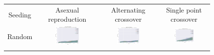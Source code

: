 \documentclass{article}
\begin{document}
\pagestyle{empty}
\begin{landscape}
\begin{figure}[t]
\begin{center}
\begin{tabular}{c c c c}
    Seeding & Asexual reproduction & Alternating crossover & Single point crossover \\
    Random & \includegraphics[align=c,width=0.42\textwidth]{rc/e1/1} & \includegraphics[align=c,width=0.42\textwidth]{rc/e1/2} & \includegraphics[align=c,width=0.42\textwidth]{rc/e1/3} \\
    & & & \\

\end{tabular}
\end{center}
\end{figure}
\end{landscape}
\end{document}

